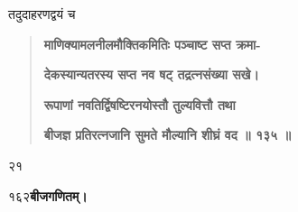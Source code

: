 \documentclass[11pt, openany]{book}
\begin{document}
\begin{sloppypar}
\hangindent=0.2in \hspace{0.2in}तदुदाहरणद्वयं च\textendash

\begin{quote}
\hspace{1in}\textbf{माणिक्यामलनीलमौक्तिकमितिः पञ्चाष्ट सप्त क्रमा-}

\hspace{1in}\textbf{देकस्यान्यतरस्य सप्त नव षट् तद्रत्नसंख्या सखे।}

\hspace{1in}\textbf{रूपाणां नवतिर्द्विषष्टिरनयोस्तौ तुल्यवित्तौ तथा}

\hspace{1in}\textbf{बीजज्ञ प्रतिरत्नजानि सुमते मौल्यानि शीघ्रं वद ॥ १३५ ॥}
\end{quote}

 २१
\end{sloppypar}
\thispagestyle{empty}
\newpage

\onehalfspacing
१६२\hspace{2in}\textbf{बीजगणितम्।} 

\vspace{5mm}
\end{document}

